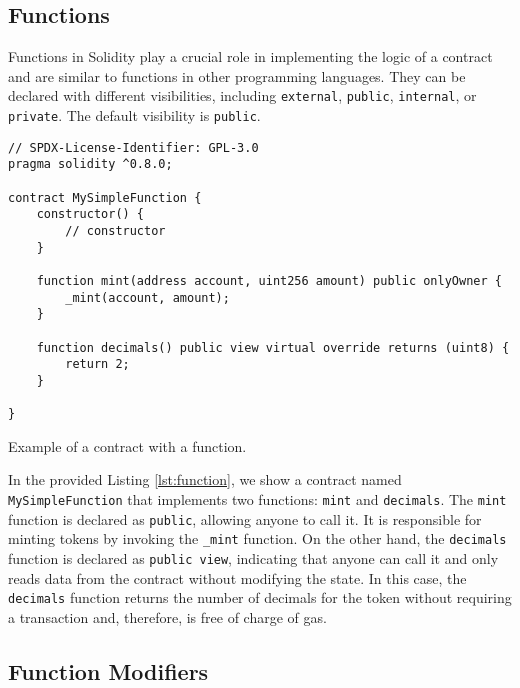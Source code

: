 
\subsection{Functions}




Functions in Solidity play a crucial role in implementing the logic of a contract and are similar to functions in other programming languages. They can 
be declared with different visibilities, including \texttt{external}, \texttt{public}, \texttt{internal}, or \texttt{private}. The default visibility is \texttt{public}.


\begin{listing}[!ht]
    \begin{verbatim}
// SPDX-License-Identifier: GPL-3.0
pragma solidity ^0.8.0;

contract MySimpleFunction {
    constructor() {
        // constructor
    }

    function mint(address account, uint256 amount) public onlyOwner {
        _mint(account, amount);
    }

    function decimals() public view virtual override returns (uint8) {
        return 2;
    }

}
    \end{verbatim}
    \caption{Example of a contract with a function.}
    \label{lst:function}
\end{listing}

In the provided Listing \ref{lst:function}, we show a contract named \texttt{MySimpleFunction} that implements two functions: \texttt{mint} and \texttt{decimals}.
The \texttt{mint} function is declared as \texttt{public}, allowing anyone to call it. It is responsible for minting tokens by invoking the \texttt{\_mint} function.
On the other hand, the \texttt{decimals} function is declared as \texttt{public view}, indicating that anyone can call it and only reads data from the contract without
modifying the state. In this case, the \texttt{decimals} function returns the number of decimals for the token without requiring a transaction and, therefore, is free of
charge of gas.


\subsection{Function Modifiers}


